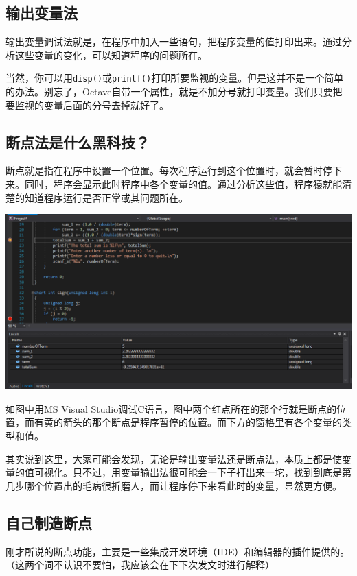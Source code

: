 \documentclass[12pt]{article}
\begin{document}
\begin{spacing}{1.4}
\subsection{输出变量法}

输出变量调试法就是，在程序中加入一些语句，把程序变量的值打印出来。通过分析这些变量的变化，可以知道程序的问题所在。

当然，你可以用\texttt{disp()}或\texttt{printf()}打印所要监视的变量。但是这并不是一个简单的办法。别忘了，Octave自带一个属性，就是不加分号就打印变量。我们只要把要监视的变量后面的分号去掉就好了。

\subsection{断点法是什么黑科技？}

断点就是指在程序中设置一个位置。每次程序运行到这个位置时，就会暂时停下来。同时，程序会显示此时程序中各个变量的值。通过分析这些值，程序猿就能清楚的知道程序运行是否正常或其问题所在。

\includegraphics[width=\linewidth]{breakpoint_vs.png}

如图中用MS Visual Studio调试C语言，图中两个红点所在的那个行就是断点的位置，而有黄的箭头的那个断点是程序暂停的位置。而下方的窗格里有各个变量的类型和值。

其实说到这里，大家可能会发现，无论是输出变量法还是断点法，本质上都是使变量的值可视化。只不过，用变量输出法很可能会一下子打出来一坨，找到到底是第几步哪个位置出的毛病很折磨人，而让程序停下来看此时的变量，显然更方便。

\subsection{自己制造断点}

刚才所说的断点功能，主要是一些集成开发环境（IDE）和编辑器的插件提供的。（这两个词不认识不要怕，我应该会在下下次发文时进行解释）


\end{spacing}
\end{document}
